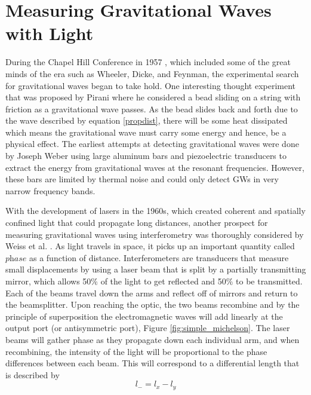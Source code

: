 	\section{Measuring Gravitational Waves with Light}\label{measuringGWs}
	During the Chapel Hill Conference in 1957 \cite{Chapel_Hill}, which included some of the great minds of the era such as Wheeler, Dicke, and Feynman, the experimental search for gravitational waves began to take hold.  One interesting thought experiment that was proposed by Pirani \cite{SmootBrief}\cite{PiraniPhysicalSignificance} where he considered a bead sliding on a string with friction as a gravitational wave passes.  As the bead slides back and forth due to the wave described by equation \ref{propdist}, there will be some heat dissipated which means the gravitational wave must carry some energy and hence, be a physical effect. The earliest attempts at detecting gravitational waves were done by Joseph Weber \cite{Weber} using large aluminum bars and piezoelectric transducers to extract the energy from gravitational waves at the resonant frequencies.  However, these bars are limited by thermal noise and could only detect GWs in very narrow frequency bands. 
	
	With the development of lasers in the 1960s, which created coherent and spatially confined light that could propagate long distances, another prospect for measuring gravitational waves using interferometry was thoroughly considered by Weiss et al. \cite{NSFproposal}.  As light travels in space, it picks up an important quantity called $\textit{phase}$ as a function of distance.  Interferometers are transducers that measure small displacements by using a laser beam that is split by a partially transmitting mirror, which allows 50$\%$ of the light to get reflected and 50$\%$ to be transmitted.  Each of the beams travel down the arms and reflect off of mirrors and return to the beamsplitter.  Upon reaching the optic, the two beams recombine and by the principle of superposition  the electromagnetic waves will add linearly at the output port (or antisymmetric port), Figure \ref{fig:simple_michelson}.  The laser beams will gather phase as they propagate down each individual arm, and when recombining, the intensity of the light will be proportional to the phase differences between each beam.  This will correspond to a differential length that is described by
	\begin{equation}
	l_{-} = l_{x} - l_{y}
	\end{equation}
	
